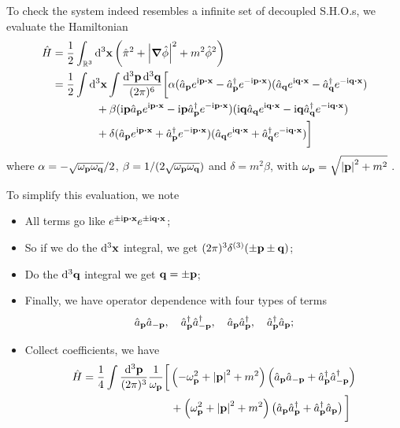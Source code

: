 \documentclass[a4paper,11pt]{article}
\begin{document}
	To check the system indeed resembles a infinite set of decoupled S.H.O.s, we evaluate the Hamiltonian 
	\begin{align*}
		\hat H & = \frac{1}{2} \int _{\mathbb{R}^3} \dd[3]{\vb x} \left( \hat \pi^2 + \abs{\grad \hat \phi}^2 + m^2 \hat \phi^2 \right)\\
		& = \frac{1}{2} \int \dd[3]{\vb x} \int \frac{\dd[3]{\vb p} \dd[3]{\vb q}}{(2 \pi)^6} \bigg[ \alpha (\hat a _{\vb p} e ^{\mathrm{i} \vb p \vdot \vb x} - \hat a^\dagger _{\vb p} e ^{-\mathrm{i} \vb p \vdot \vb x}) (\hat a _{\vb q} e ^{\mathrm{i} \vb q \vdot \vb x} - \hat a^\dagger _{\vb q} e ^{-\mathrm{i} \vb q \vdot \vb x})\\
		& \qquad \qquad + \beta (\mathrm{i} \vb p \hat a _{\vb p} e ^{\mathrm{i} \vb p \vdot \vb x} - \mathrm{i} \vb p \hat a^\dagger _{\vb p} e ^{-\mathrm{i} \vb p \vdot \vb x}) (\mathrm{i}\vb q \hat a _{\vb q} e ^{\mathrm{i} \vb q \vdot \vb x} - \mathrm{i}\vb q\hat a^\dagger _{\vb q} e ^{-\mathrm{i} \vb q \vdot \vb x})\\
		&\qquad  \qquad + \delta (\hat a _{\vb p} e ^{\mathrm{i} \vb p \vdot \vb x} + \hat a^\dagger _{\vb p} e ^{-\mathrm{i} \vb p \vdot \vb x}) (\hat a _{\vb q} e ^{\mathrm{i} \vb q \vdot \vb x} + \hat a^\dagger _{\vb q} e ^{-\mathrm{i} \vb q \vdot \vb x})\bigg]
	\end{align*}
	where $\alpha = - \sqrt{\omega _{\vb p} \omega _{\vb q}} / 2$, $\beta = 1/(2 \sqrt{\omega _{\vb p} \omega _{\vb q}})$ and $\delta = m^2 \beta$, with $\omega _{\vb p} = \sqrt{\abs{\vb p}^2 + m^2}$ . 

	To simplify this evaluation, we note
	\begin{itemize}
		\item All terms go like $e ^{\pm \mathrm{i} \vb p \vdot \vb x} e ^{\pm \mathrm{i} \vb q \vdot \vb x}$;
		\item So if we do the $\dd[3]{\vb x}$ integral, we get $(2 \pi)^3 \delta ^{(3)}(\pm \vb p \pm \vb q)$;
		\item Do the $\dd[3]{\vb q}$ integral we get $\vb q = \pm \vb p$;
		\item Finally, we have operator dependence with four types of terms \[
			\hat a _{\vb p}\hat a _{-\vb p}, \quad \hat a^\dagger _{\vb p} \hat a^\dagger _{-\vb p}, \quad \hat a _{\vb p}\hat a^\dagger _{\vb p}, \quad \hat a^\dagger _{\vb p}\hat a _{\vb p};
		\]
		\item Collect coefficients, we have \begin{align*}
			\hat H & = \frac{1}{4} \int \frac{\dd[3]{\vb p}}{(2\pi)^{3}} \frac{1}{\omega _{\vb p}} \bigg[\left( - \omega^2 _{\vb p} + \abs{\vb p}^2 + m^2 \right) \left( \hat a _{\vb p} \hat a _{-\vb p} + \hat a^\dagger _{\vb p} \hat a^\dagger _{-\vb p} \right) \\
			& \qquad \qquad \qquad \qquad + \left(\omega^2 _{\vb p} + \abs{\vb p}^2 + m^2 \right) \left( \hat a _{\vb p} \hat a^\dagger _{\vb p} + \hat a^\dagger _{\vb p} \hat a _{\vb p} \right) \bigg]
		\end{align*}
	\end{itemize}
\end{document}
